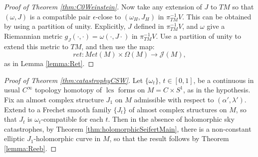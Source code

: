 \documentclass{amsart}
\numberwithin{equation}{section}
\theoremstyle{definition}
\theoremstyle{remark}
\DeclareMathOperator{\lcs}{lcs}
\begin{document}
\begin{proof} [Proof of Theorem \ref{thm:C0Weinstein}]
   Now take any extension of $J$ to $TM$ so that $(\omega,J)$ is a compatible pair 
$\epsilon$-close to $(\omega _{H}, J _{H}  )$ in $\pi _{TM} ^{-1} V$.
This can be obtained by using a partition of unity.
Explicitly, $J$ defined in $\pi _{TM} ^{-1} V$, and $\omega$ give a Riemannian metric $g _{J} (\cdot, \cdot) = \omega (\cdot, J \cdot)$ in $\pi _{TM} ^{-1} V$. Use a partition of unity to extend this metric to $TM$, 
and then use the map:
\begin{equation*}
ret: Met (M) \times \Omega (M)  \to \mathcal{J} (M),
\end{equation*}
as in Lemma \ref{lemma:Ret}. 
\end{proof}
\begin{proof} [Proof of Theorem \ref{thm:catastrophyCSW}] 
Let $\{\omega _{t} \}$, $t \in [0,1]$, be a continuous in usual $C ^{\infty} $ topology homotopy of $\lcs$ forms on $M=C \times S ^{1}$, as in the hypothesis. Fix an almost complex structure $J _{1} $ on $M$ admissible with respect to $(\alpha',\lambda')$.
Extend to a Frechet smooth family $\{J _{t} \}$ of almost complex structures on $M$, so that $J _{t} $ is $\omega _{t} $-compatible for each $t$. Then in the absence of holomorphic sky catastrophes,  by Theorem \ref{thm:holomorphicSeifertMain}, there is a non-constant elliptic $J _{1} $-holomorphic curve in $M$, so that the result follows by Theorem \ref{lemma:Reeb}.

\end{proof}
\end{document}
